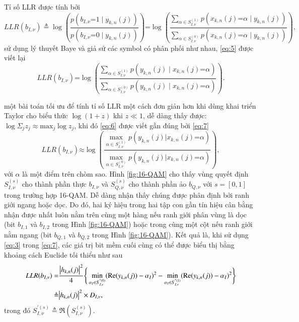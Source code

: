 Tỉ số LLR được tính bởi
\begin{equation}
         LLR(b_{I,\nu})  \triangleq \log \left(\dfrac{p(b_{I,\nu} \mathord{=} 1 \mid y_{k,n}(j))}{p(b_{I,\nu} \mathord{=} 0 \mid y_{k,n}(j))}\right)
         \mathord{=} \log \left(\dfrac{\sum_{\alpha\in S_{I,\nu}^{(1)}}p(x_{k,n}(j)\mathord{=} \alpha\mid y_{k,n}(j))}{\sum_{\alpha\in S_{I,\nu}^{(0)}}p(x_{k,n}(j)\mathord{=} \alpha\mid y_{k,n}(j))}\right),
    \label{eq:5}
\end{equation}
sử dụng lý thuyết Baye và giả sử các symbol có phân phối như nhau, \eqref{eq:5} được viết lại
\begin{equation}
    LLR(b_{I,\nu})\mathord{=}\log \left(\dfrac{\sum_{\alpha\in S_{I,\nu}^{(1)}}p(y_{k,n}(j) \mid x_{k,n}(j)\mathord{=} \alpha)}
    {\sum_{\alpha\in S_{I,\nu}^{(0)}}p(y_{k,n}(j) \mid x_{k,n}(j)\mathord{=} \alpha)}\right).
    \label{eq:6}
\end{equation}

một bài toán tối ưu để tính tỉ số LLR một cách đơn giản hơn khi dùng khai triển Taylor cho biểu thức $\log (1+z)$ khi $z \ll 1$, dễ dàng thấy được: $\log \Sigma_jz_j \approx \text{max}_j \log z_j$, khi đó \eqref{eq:6} được viết gần đúng bởi \eqref{eq:7}
\begin{equation}
    LLR(b_{I,\nu}) \mathord{\approx}\log \left(\dfrac{\max_{\alpha\in S_{I,\nu}^{(1)}} p(y_{k,n}(j) \mathord{\mid} x_{k,n}(j)\mathord{=} \alpha)}
    {\max_{\alpha\in S_{I,\nu}^{(0)}} p(y_{k,n}(j) \mathord{\mid} x_{k,n}(j)\mathord{=} \alpha)}\right),
    \label{eq:7}
\end{equation}
với $\alpha$ là một điểm trên chòm sao. Hình \ref{fig:16-QAM} cho thấy vùng quyết định $S_{I,\nu}^{(s)}$ cho thành phần thực $b_{I,\nu}$ và $S_{Q,\nu}^{(s)}$ cho thành phần ảo $b_{Q,\nu}$ với $s=[0,1]$ trong trường hợp 16-QAM. Dễ dàng nhận thấy chúng được phân định bởi ranh giới ngang hoặc dọc. Do đó, hai ký hiệu trong hai tập con gần tín hiệu cân bằng nhận được nhất luôn nằm trên cùng một hàng nếu ranh giới phân vùng là dọc (bit $b_{I,1}$ và $b_{I,2}$ trong Hình \ref{fig:16-QAM}) hoặc trong cùng một cột nếu ranh giới nằm ngang (bit $b_{Q,1}$ và $b_{Q,2}$ trong Hình \ref{fig:16-QAM}). Kết quả là, khi sử dụng \eqref{eq:3} trong \eqref{eq:7}, các giá trị bit mềm cuối cùng có thể được biểu thị bằng khoảng cách Euclide tối thiểu như sau
\begin{equation}
    \begin{split}
        LLR(b_{I,\nu}) =&\dfrac{\absolutevalue{h_{k,n}(j)}^2}{4} \Bigg\{ \min_{\alpha_I \in S_{I,\nu}^{'(0)}}(\Re(y_{k,n}(j)) - \alpha_I)^2 - \min_{\alpha_I \in S_{I,\nu}^{'(1)}}(\Re(y_{k,n}(j)) - \alpha_I)^2 \Bigg\}\\
        \triangleq & \absolutevalue{h_{k,n}(j)}^2 \times D_{I,\nu}, 
    \end{split}
    \label{eq:8}
\end{equation}
trong đó $S_{I,\nu}^{'(s)} \triangleq \Re(S_{I,\nu}^{(s)})$.


